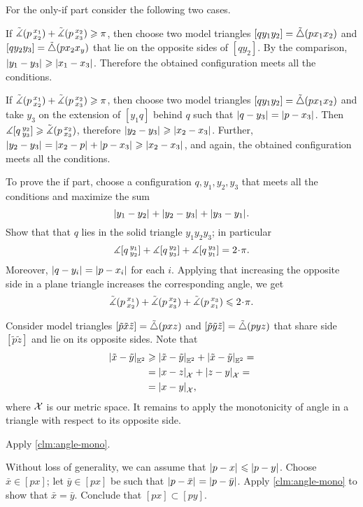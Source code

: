  For the only-if part consider the following two cases.

If $\tilde\measuredangle(p\,{}^{x_1}_{x_2})+\tilde\measuredangle(p\,{}^{x_2}_{x_3})\geqslant \pi$, then choose two model triangles $[qy_1y_2]\z=\modtrig(px_1x_2)$ and $[qy_2y_3]=\tilde\triangle(px_2x_y)$ that lie on the opposite sides of $[qy_2]$.
By the comparison, $\dist{y_1}{y_3}{}\ge \dist{x_1}{x_3}{}$.
Therefore the obtained configuration meets all the conditions.

If $\tilde\measuredangle(p\,{}^{x_1}_{x_2})+\tilde\measuredangle(p\,{}^{x_2}_{x_3})\geqslant \pi$, then choose two model triangles $[qy_1y_2]\z=\modtrig(px_1x_2)$
and take $y_3$ on the extension of $[y_1q]$ behind $q$ such that $\dist{q}{y_3}{}=\dist{p}{x_3}{}$.
Then $\measuredangle [q\,{}^{y_2}_{y_3}]\geqslant \tilde\measuredangle(p\,{}^{x_2}_{x_3})$, therefore $\dist{y_2}{y_3}{}\ge \dist{x_2}{x_3}{}$.
Further, $\dist{y_2}{y_3}{}=\dist{x_2}{p}{}+\dist{p}{x_3}{} \ge \dist{x_2}{x_3}{}$,
and again, the obtained configuration meets all the conditions.

To prove the if part, choose a configuration $q,y_1,y_2,y_3$ that meets all the conditions and maximize the sum
\[\dist{y_1}{y_2}{}+\dist{y_2}{y_3}{}+\dist{y_3}{y_1}{}.\]
Show that that $q$ lies in the solid triangle $y_1y_2y_3$;
in particular 
\[\mangle \hinge q{y_1}{y_2}+\mangle \hinge q{y_2}{y_3}+ \mangle \hinge q{y_3}{y_1}=2\cdot\pi.\]
Moreover, $\dist{q}{y_i}{}=\dist{p}{x_i}{}$ for each $i$.
Applying that increasing the opposite side in a plane triangle increases the corresponding angle, we get 
\[\angk  p{x_1}{x_2}+\angk p{x_2}{x_3}+\angk p{x_3}{x_1}
\le 
2\cdot\pi.
\]

Consider model triangles $[\tilde p\tilde x\tilde z]=\tilde\triangle(pxz)$ and $[\tilde p\tilde y\tilde z]=\tilde\triangle(pyz)$
that share side $[\tilde p\tilde z]$ and lie on its opposite sides.
Note that 
\begin{align*}
\dist{\tilde x}{\tilde y}{\EE^2}
&\ge \dist{\tilde x}{\tilde y}{\EE^2}+\dist{\tilde x}{\tilde y}{\EE^2}=
\\
&=\dist{x}{z}{\spc{X}}+\dist{z}{y}{\spc{X}}=
\\
&=\dist{x}{y}{\spc{X}},
\end{align*}
where $\mathcal{X}$ is our metric space.
It remains to apply the monotonicity of angle in a triangle with respect to its opposite side. 


Apply \ref{clm:angle-mono}.

Without loss of generality, we can assume that $\dist{p}{x}{}\le \dist{p}{y}{}$.
Choose $\bar x\in [px]$;
let $\bar y\in [px]$ be such that $\dist{p}{\bar x}{}=\dist{p}{\bar y}{}$.
Apply \ref{clm:angle-mono} to show that $\bar x=\bar y$.
Conclude that $[px]\subset [py]$.

